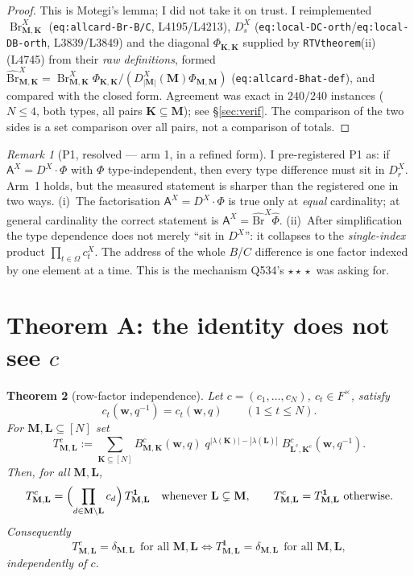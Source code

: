 \documentclass[11pt]{article}
\theoremstyle{plain}
\newtheorem{thm}{Theorem}
\theoremstyle{definition}
\theoremstyle{remark}
\newtheorem{rem}[thm]{Remark}
\newcommand{\bM}{\mathbf M}
\newcommand{\bK}{\mathbf K}
\newcommand{\bL}{\mathbf L}
\newcommand{\bw}{\mathbf w}
\newcommand{\cm}{{\mathrm c}}
\newcommand{\Br}{\operatorname{Br}}
\newcommand{\Bh}{\widehat{\mathrm{Br}}}
\begin{document}
\begin{proof}
This is Motegi's lemma; I did not take it on trust. I reimplemented
$\Br^X_{\bM,\bK}$ (\texttt{eq:allcard-Br-B/C}, L4195/L4213), $D^X_s$
(\texttt{eq:local-DC-orth}/\texttt{eq:local-DB-orth}, L3839/L3849) and the
diagonal $\Phi_{\bK,\bK}$ supplied by \texttt{RTVtheorem}(ii) (L4745) from their
\emph{raw definitions}, formed
$\Bh^X_{\bM,\bK}=\Br^X_{\bM,\bK}\Phi_{\bK,\bK}/(D^X_{|\bM|}(\bM)\Phi_{\bM,\bM})$
(\texttt{eq:allcard-Bhat-def}), and compared with the closed form. Agreement was
exact in $240/240$ instances ($N\le4$, both types, all pairs
$\bK\subseteq\bM$); see \S\ref{sec:verif}. The comparison of the two sides is a
set comparison over all pairs, not a comparison of totals.
\end{proof}

\begin{rem}[P1, resolved --- arm 1, in a refined form]
I pre-registered P1 as: if $\mathsf A^X=D^X\cdot\Phi$ with $\Phi$
type-independent, then every type difference must sit in $D^X_r$. Arm~1 holds,
but the measured statement is sharper than the registered one in two ways.
(i)~The factorisation $\mathsf A^X=D^X\cdot\Phi$ is true only at \emph{equal}
cardinality; at general cardinality the correct statement is
$\mathsf A^X=\Bh^X\widehat\Phi$. (ii)~After simplification the type dependence does
not merely ``sit in $D^X$'': it collapses to the \emph{single-index} product
$\prod_{t\in\Omega}c^X_t$. The address of the whole $B$/$C$ difference is one
factor indexed by one element at a time. This is the mechanism Q534's
$\star\!\star\!\star$ was asking for.
\end{rem}

\section{Theorem A: the identity does not see $c$}
\label{sec:thmA}

\begin{thm}[row-factor independence]
\label{thm:A}
Let $c=(c_1,\dots,c_N)$, $c_t\in F^\times$, satisfy
\begin{equation}
c_t(\bw,q^{-1})=c_t(\bw,q)\qquad (1\le t\le N).
\tag{H}\label{eq:H}
\end{equation}
For $\bM,\bL\subseteq[N]$ set
\begin{equation}
T^c_{\bM,\bL}
:=\sum_{\bK\subseteq[N]}
B^c_{\bM,\bK}(\bw,q)\;
q^{|\lambda(\bK)|-|\lambda(\bL)|}\;
B^c_{\bL^\cm,\bK^\cm}(\bw,q^{-1}).
\label{eq:T}
\end{equation}
Then, for all $\bM,\bL$,
\begin{equation}
T^c_{\bM,\bL}=\Bigl(\prod_{d\in\bM\setminus\bL}c_d\Bigr)\,T^{\mathbf 1}_{\bM,\bL}
\quad\text{whenever }\bL\subsetneq\bM,
\qquad
T^c_{\bM,\bL}=T^{\mathbf 1}_{\bM,\bL}\ \text{otherwise.}
\label{eq:main}
\end{equation}
Consequently
\[
T^c_{\bM,\bL}=\delta_{\bM,\bL}\ \ \text{for all }\bM,\bL
\iff
T^{\mathbf 1}_{\bM,\bL}=\delta_{\bM,\bL}\ \ \text{for all }\bM,\bL,
\]
independently of $c$.
\end{thm}
\end{document}
